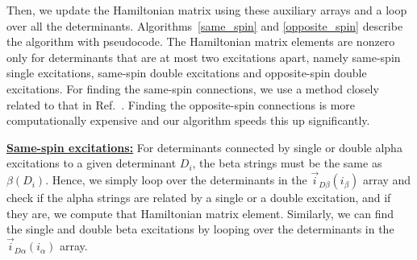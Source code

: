 \documentclass[%
reprint,
 superscriptaddress,
 amsmath,amssymb,
 aps,
]{revtex4-1}
\def\veca{\vec{\alpha}}
\def\ia{i_\alpha}
\def\ib{i_\beta}
\def\veciDa{\vec{i}_{D\alpha}}
\def\veciDb{\vec{i}_{D\beta}}
\begin{document}
%

Then, we update the Hamiltonian matrix using these auxiliary arrays and a loop over all the determinants.
Algorithms~\ref{same_spin} and \ref{opposite_spin} describe the algorithm with pseudocode.
The Hamiltonian matrix elements are nonzero only for determinants that are at most two excitations apart, namely same-spin
single excitations, same-spin double excitations and opposite-spin
double excitations.
For finding the same-spin connections, we use a method closely related
to that in Ref.~\cite{SceAppGinCaf-JCoC-16}.
Finding the opposite-spin connections is more computationally expensive and our algorithm speeds this up significantly.

\noindent \underline{\bf Same-spin excitations:} For determinants connected by single or double alpha excitations to a given determinant $D_i$, the beta strings must be the same as $\beta(D_i)$.
Hence, we simply loop over the determinants in the $\veciDb(\ib)$ array and check if the alpha strings are related by a single or a double excitation,
and if they are, we compute that Hamiltonian matrix element.
Similarly, we can find the single and double beta excitations by looping over the determinants in
the $\veciDa(\ia)$ array.
\end{document}
